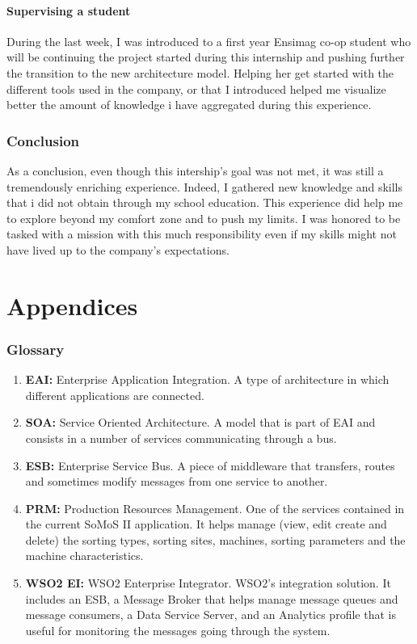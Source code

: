 \documentclass[12pt,a4paper,twoside]{article}
\begin{document}
\subsection{Supervising a student}
During the last week, I was introduced to a first year Ensimag co-op student who will be continuing the project started during this internship and pushing further the transition to the new architecture model. Helping her get started with the different tools used in the company, or that I introduced helped me visualize better the amount of knowledge i have aggregated during this experience.
\section{Conclusion}
As a conclusion, even though this intership's goal was not met, it was still a tremendously enriching experience. Indeed, I gathered new knowledge and skills that i did not obtain through my school education. This experience did help me to explore beyond my comfort zone and to push my limits. I was honored to be tasked with a mission with this much responsibility even if my skills might not have lived up to the company's expectations.   
\newpage
\part*{Appendices}
\section*{Glossary}
\begin{enumerate}
\item \textbf{EAI:} Enterprise Application Integration. A type of architecture in which different applications are connected.
\item \textbf{SOA:} Service Oriented Architecture. A model that is part of EAI and consists in a number of services communicating through a bus.
\item \textbf{ESB:} Enterprise Service Bus. A piece of middleware that transfers, routes and sometimes modify messages from one service to another.
\item \textbf{PRM:} Production Resources Management. One of the services contained in the current SoMoS II application. It helps manage (view, edit create and delete) the sorting types, sorting sites, machines, sorting parameters and the machine characteristics.
\item \textbf{WSO2 EI:} WSO2 Enterprise Integrator. WSO2's integration solution. It includes an ESB, a Message Broker that helps manage message queues and message consumers, a Data Service Server, and an Analytics profile that is useful for monitoring the messages going through the system.
\end{enumerate}
\end{document}
